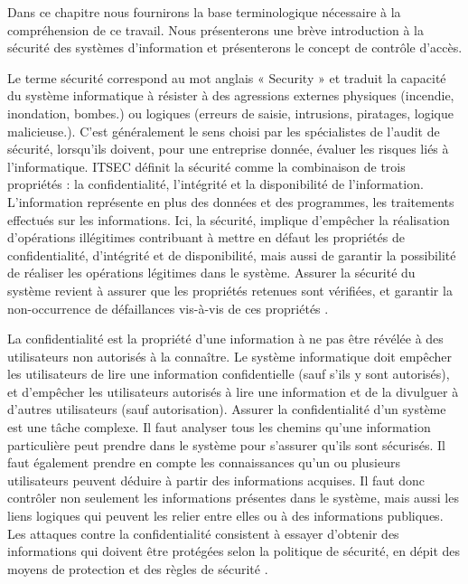 \label{chapGénéralité}


\label{sectionIntroduction}

Dans ce chapitre nous fournirons la base terminologique nécessaire à la compréhension de ce travail. Nous présenterons une brève introduction à la sécurité des systèmes d'information et présenterons le concept de contrôle d'accès.

\label{sectionSécuritéSI}

\label{sectionSécurité}
Le terme sécurité correspond au mot anglais « Security » et traduit la capacité du système informatique à résister à des agressions externes physiques (incendie, inondation, bombes.) ou logiques (erreurs de saisie, intrusions, piratages, logique malicieuse.). C'est généralement le sens choisi par les spécialistes de l'audit de sécurité, lorsqu'ils doivent, pour une entreprise donnée, évaluer les risques liés à l'informatique. ITSEC définit la sécurité comme la combinaison de trois propriétés : la confidentialité, l'intégrité et la disponibilité de l'information. L'information représente en plus des données et des programmes, les traitements effectués sur les informations. Ici, la sécurité, implique d'empêcher la réalisation d'opérations illégitimes contribuant à mettre en défaut les propriétés de confidentialité, d'intégrité et de disponibilité, mais aussi de garantir la possibilité de réaliser les opérations légitimes dans le système. Assurer la sécurité du système revient à assurer que les propriétés retenues sont vérifiées, et garantir la non-occurrence de défaillances vis-à-vis de ces propriétés \cite{theseBenoit}.

\label{sectionConfidentialité}
  La confidentialité est la propriété d'une information à ne pas être révélée à des utilisateurs non autorisés à la connaître. Le système informatique doit empêcher les utilisateurs de lire une information confidentielle (sauf s'ils y sont autorisés), et d'empêcher les utilisateurs autorisés à lire une information et de la divulguer à d'autres utilisateurs (sauf autorisation). Assurer la confidentialité d'un système est une tâche complexe. Il faut analyser tous les chemins qu'une information particulière peut prendre dans le système pour s'assurer qu'ils sont sécurisés. Il faut également prendre en compte les connaissances qu'un ou plusieurs utilisateurs peuvent déduire à partir des informations acquises. Il faut donc contrôler non seulement les informations présentes dans le système, mais aussi les liens logiques qui peuvent les relier entre elles ou à des informations publiques. Les attaques contre la confidentialité consistent à essayer d'obtenir des informations qui doivent être protégées selon la politique de sécurité, en dépit des moyens de protection et des règles de sécurité \cite{theseBenoit}.

